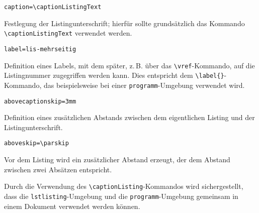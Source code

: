 \begin{seList}
\item \verb+caption=\captionListingText+

Festlegung der Listingunterschrift; hierf\"ur sollte grunds\"atzlich das Kommando \verb+\captionListingText+ verwendet werden.

\item \verb+label=lis-mehrseitig+

Definition eines Labels, mit dem sp\"ater, z.\,B. \"uber das \verb+\vref+-Kommando, auf die Listingnummer zugegriffen werden kann. \newline 
Dies entspricht dem \verb+\label{}+-Kommando, das beispielsweise bei einer \verb+programm+-Umgebung verwendet wird.

\item \verb+abovecaptionskip=3mm+

Definition eines zus\"atzlichen Abstands zwischen dem eigentlichen Listing und der Listingunterschrift.

\item \verb+aboveskip=\parskip+ 

Vor dem Listing wird ein zus\"atzlicher Abstand erzeugt, der dem Abstand zwischen zwei Abs\"atzen entspricht.
\end{seList}

Durch die Verwendung des \verb+\captionListing+-Kommandos wird sichergestellt, dass die \verb+lstlisting+-Umgebung und die 
\verb+programm+-Umgebung gemeinsam in einem Dokument verwendet werden k\"onnen.

